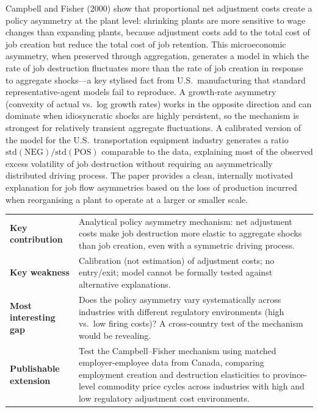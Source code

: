 Campbell and Fisher (2000) show that proportional net adjustment costs create
a policy asymmetry at the plant level: shrinking plants are more sensitive to
wage changes than expanding plants, because adjustment costs add to the total
cost of job creation but reduce the total cost of job retention. This
microeconomic asymmetry, when preserved through aggregation, generates a model
in which the rate of job destruction fluctuates more than the rate of job
creation in response to aggregate shocks---a key stylised fact from U.S.\
manufacturing that standard representative-agent models fail to reproduce. A
growth-rate asymmetry (convexity of actual vs.\ log growth rates) works in the
opposite direction and can dominate when idiosyncratic shocks are highly
persistent, so the mechanism is strongest for relatively transient aggregate
fluctuations. A calibrated version of the model for the U.S.\ transportation
equipment industry generates a ratio $\text{std}(\text{NEG})/\text{std}(
\text{POS})$ comparable to the data, explaining most of the observed excess
volatility of job destruction without requiring an asymmetrically distributed
driving process. The paper provides a clean, internally motivated explanation
for job flow asymmetries based on the loss of production incurred when
reorganising a plant to operate at a larger or smaller scale.

\vspace{6pt}
\begin{quickref}
\begin{tabularx}{\linewidth}{@{}lX@{}}
\textbf{Key contribution} &
  Analytical policy asymmetry mechanism: net adjustment costs make job
  destruction more elastic to aggregate shocks than job creation, even with
  a symmetric driving process. \\[4pt]
\textbf{Key weakness} &
  Calibration (not estimation) of adjustment costs; no entry/exit; model
  cannot be formally tested against alternative explanations. \\[4pt]
\textbf{Most interesting gap} &
  Does the policy asymmetry vary systematically across industries with
  different regulatory environments (high vs.\ low firing costs)? A
  cross-country test of the mechanism would be revealing. \\[4pt]
\textbf{Publishable extension} &
  Test the Campbell--Fisher mechanism using matched employer-employee data
  from Canada, comparing employment creation and destruction elasticities
  to province-level commodity price cycles across industries with high and
  low regulatory adjustment cost environments.
\end{tabularx}
\end{quickref}

